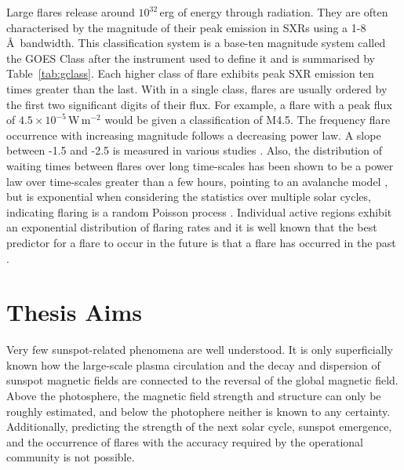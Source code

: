 Large flares release around $10^{32}$\,erg of energy through radiation. They are often characterised by the magnitude of their peak emission in \glspl{SXR} using a 1-8\,\AA\ bandwidth. This classification system is a base-ten magnitude system called the GOES Class after the instrument used to define it and is summarised by Table~\ref{tab:gclass}. Each higher class of flare exhibits peak SXR emission ten times greater than the last. With in a single class, flares are usually ordered by the first two significant digits of their flux. For example, a flare with a peak flux of $4.5\times10^{-5}$\,W\,m$^{-2}$ would be given a classification of M4.5. The frequency flare occurrence with increasing magnitude follows a decreasing power law. A slope between -1.5 and -2.5 is measured in various studies \citep[see Figure~\ref{fig:flarephase};][]{Aschwanden:2011}. 
Also, the distribution of waiting times between flares over long time-scales has been shown to be a power law over time-scales greater than a few hours, pointing to an avalanche model \citep{Lu:1993}, but is exponential when considering the statistics over multiple solar cycles, indicating flaring is a random Poisson process \citep{Wheatland:2000}. Individual active regions exhibit an exponential distribution of flaring rates \citep{Wheatland:2001} and it is well known that the best predictor for a flare to occur in the future is that a flare has occurred in the past \citep{Wheatland:2005}.

\section{Thesis Aims}\label{intro:aims}

Very few sunspot-related phenomena are well understood. It is only superficially known how the large-scale plasma circulation and the decay and dispersion of sunspot magnetic fields are connected to the reversal of the global magnetic field. Above the photosphere, the magnetic field strength and structure can only be roughly estimated, and below the photophere neither is known to any certainty. Additionally, predicting the strength of the next solar cycle, sunspot emergence, and the occurrence of flares with the accuracy required by the operational community is not possible. 

